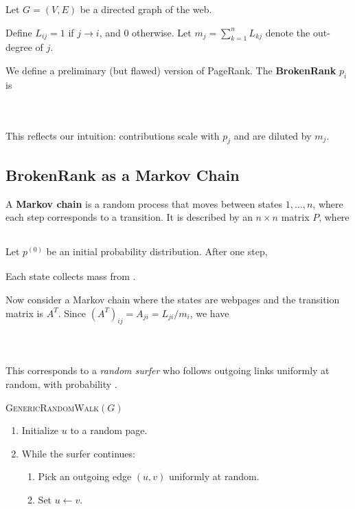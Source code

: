 \documentclass[11pt]{exam}
\begin{document}
Let $G = (V,E)$ be a directed graph of the web.

Define $L_{ij} = 1$ if $j \to i$, and $0$ otherwise.  
Let $m_j = \sum_{k=1}^n L_{kj}$ denote the out-degree of $j$.

\vspace{0.5em}

We define a preliminary (but flawed) version of PageRank. The \textbf{BrokenRank} $p_i$ is
\[\phantom{
p_i = \sum_{j \to i} \frac{p_j}{m_j}
    = \sum_{j=1}^n \frac{L_{ij}}{m_j} \, p_j.}
\]

This reflects our intuition: contributions scale with $p_j$ and are diluted by $m_j$.

\subsection*{BrokenRank as a Markov Chain}

A \textbf{Markov chain} is a random process that moves between states $1,\dots,n$, where each step corresponds to a transition.  
It is described by an $n \times n$ matrix $P$, where
\[
\phantom{P_{ij} = P(\text{go from } i \text{ to } j).}
\]

\vspace{0.5em}

Let $p^{(0)}$ be an initial probability distribution.  
After one step,
\[
\phantom{p^{(1)} = P^T p^{(0)}.}
\]
Each state collects mass from .

\vspace{0.5em}

Now consider a Markov chain where the states are webpages and the transition matrix is $A^T$.  
Since $(A^T)_{ij} = A_{ji} = L_{ji}/m_i$, we have
\[
\phantom{
P(\text{go from } i \text{ to } j) =
\begin{cases}
\frac{1}{m_i} & \text{if } i \to j, \\
0 & \text{otherwise}.
\end{cases}
}
\]

\vspace{0.5em}

This corresponds to a \emph{random surfer} who follows outgoing links uniformly at random, with probability .

\vspace{0.5em}

\textsc{GenericRandomWalk}$(G)$
\begin{enumerate}
    \item Initialize $u$ to a random page.
    \item While the surfer continues:
    \begin{enumerate}
        \item Pick an outgoing edge $(u,v)$ uniformly at random.
        \item Set $u \leftarrow v$.
    \end{enumerate}
\end{enumerate}
\end{document}
